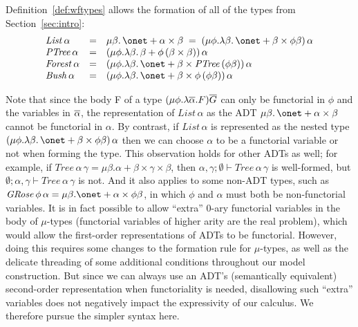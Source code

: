 \documentclass{lmcs}
\theoremstyle{plain}\newtheorem{satz}[thm]{Satz}
\begin{document}
Definition~\ref{def:wftypes} allows the formation of all of the types
from Section~\ref{sec:intro}:
\[\begin{array}{lll}
\mathit{List}\, \alpha & = & \mu \beta. \,\onet + \alpha \times
\beta\; = \; (\mu \phi. \lambda \beta.\,\onet + \beta \times \phi
\beta)\,\alpha\\ 
\mathit{PTree}\,\alpha & = & (\mu \phi. \lambda \beta.\,\beta +
\phi\,(\beta \times \beta))\,\alpha\\
\mathit{Forest}\,\alpha & = & (\mu \phi. \lambda \beta. \,\onet +
\beta \times \mathit{PTree}\,(\phi \beta))\,\alpha\\ 
\mathit{Bush}\,\alpha & = & (\mu \phi.\lambda \beta. \,\onet + \beta
\times \phi\,(\phi\beta))\,\alpha 
\end{array}\]
           
Note that since the body F of a type $(\mu \phi. \lambda
\overline{\alpha}. F)\overline{G}$ can only be functorial in $\phi$ and the
variables in $\overline{\alpha}$, the representation of
$\mathit{List}\,\alpha$ as the ADT $\mu \beta. \,\onet + \alpha \times
\beta$ cannot be functorial in $\alpha$. By contrast, if
$\mathit{List}\,\alpha$ is represented as the nested type $(\mu
\phi. \lambda \beta.\,\onet + \beta \times \phi \beta)\,\alpha$ then
we can choose $\alpha$ to be a functorial variable or not when forming
the type. This observation holds for other ADTs as well; for example,
if $\mathit{Tree}\,\alpha\,\gamma = \mu \beta. \alpha + \beta \times
\gamma \times \beta$, then $\alpha, \gamma; \emptyset \vdash
\mathit{Tree}\,\alpha\,\gamma$ is well-formed, but $\emptyset; \alpha,
\gamma \vdash \mathit{Tree}\,\alpha\,\gamma$ is not. And it also
applies to some non-ADT types, such as $\mathit{GRose}\,\phi\,\alpha =
\mu \beta. \onet + \alpha \times \phi\beta$, in which $\phi$ and
$\alpha$ must both be non-functorial variables.  It is in fact
possible to allow ``extra'' $0$-ary functorial variables in the body
of $\mu$-types (functorial variables of higher arity are the real
problem), which would allow the first-order representations of ADTs to
be functorial. However, doing this requires some changes to the
formation rule for $\mu$-types, as well as the delicate threading of
some additional conditions throughout our model construction.  But
since we can always use an ADT's (semantically equivalent)
second-order representation when functoriality is needed, disallowing
such ``extra'' variables does not negatively impact the expressivity
of our calculus. We therefore pursue the simpler syntax here.
\end{document}
